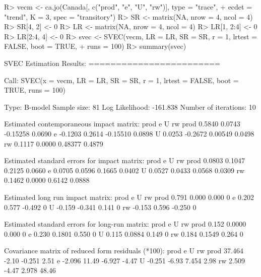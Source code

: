 \documentclass[nojss]{jss}
\begin{document}
\begin{Schunk}
\begin{Sinput}
R> vecm <- ca.jo(Canada[, c("prod", "e", "U", "rw")], type = "trace", 
+    ecdet = "trend", K = 3, spec = "transitory")
R> SR <- matrix(NA, nrow = 4, ncol = 4)
R> SR[4, 2] <- 0
R> LR <- matrix(NA, nrow = 4, ncol = 4)
R> LR[1, 2:4] <- 0
R> LR[2:4, 4] <- 0
R> svec <- SVEC(vecm, LR = LR, SR = SR, r = 1, lrtest = FALSE, boot = TRUE, 
+    runs = 100)
R> summary(svec)
\end{Sinput}
\begin{Soutput}
SVEC Estimation Results:
======================== 

Call:
SVEC(x = vecm, LR = LR, SR = SR, r = 1, lrtest = FALSE, boot = TRUE, 
    runs = 100)

Type: B-model 
Sample size: 81 
Log Likelihood: -161.838 
Number of iterations: 10 

Estimated contemporaneous impact matrix:
        prod       e        U     rw
prod  0.5840  0.0743 -0.15258 0.0690
e    -0.1203  0.2614 -0.15510 0.0898
U     0.0253 -0.2672  0.00549 0.0498
rw    0.1117  0.0000  0.48377 0.4879

Estimated standard errors for impact matrix:
       prod      e      U     rw
prod 0.0803 0.1047 0.2125 0.0660
e    0.0705 0.0596 0.1665 0.0402
U    0.0527 0.0433 0.0568 0.0309
rw   0.1462 0.0000 0.6142 0.0888

Estimated long run impact matrix:
       prod      e      U rw
prod  0.791  0.000  0.000  0
e     0.202  0.577 -0.492  0
U    -0.159 -0.341  0.141  0
rw   -0.153  0.596 -0.250  0

Estimated standard errors for long-run matrix:
      prod      e     U rw
prod 0.152 0.0000 0.000  0
e    0.230 0.1801 0.550  0
U    0.115 0.0884 0.149  0
rw   0.184 0.1549 0.264  0

Covariance matrix of reduced form residuals (*100):
       prod     e      U    rw
prod 37.464 -2.10 -0.251  2.51
e    -2.096 11.49 -6.927 -4.47
U    -0.251 -6.93  7.454  2.98
rw    2.509 -4.47  2.978 48.46
\end{Soutput}
\end{Schunk}
\end{document}
